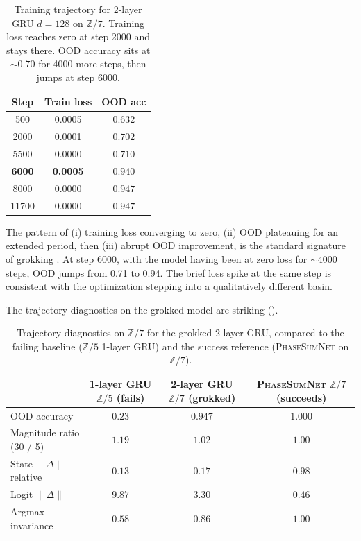 \documentclass[11pt]{article}
\theoremstyle{definition}
\newcommand{\Z}{\mathbb{Z}}
\begin{document}
\begin{table}[h]
\centering
\caption{Training trajectory for 2-layer GRU $d=128$ on $\Z/7$.
Training loss reaches zero at step 2000 and stays there. OOD
accuracy sits at $\sim 0.70$ for 4000 more steps, then jumps at
step 6000.}
\label{tab:grokking-trajectory}
\begin{tabular}{ccc}
\toprule
Step & Train loss & OOD acc \\
\midrule
500   & 0.0005 & $0.632$ \\
2000  & 0.0001 & $0.702$ \\
5500  & 0.0000 & $0.710$ \\
\textbf{6000} & \textbf{0.0005} & $\mathbf{0.940}$ \\
8000  & 0.0000 & $\mathbf{0.947}$ \\
11700 & 0.0000 & $0.947$ \\
\bottomrule
\end{tabular}
\end{table}

The pattern of (i) training loss converging to zero, (ii) OOD
plateauing for an extended period, then (iii) abrupt OOD
improvement, is the standard signature of grokking
\citep{power2022grokking}. At step 6000, with the model having been
at zero loss for $\sim$4000 steps, OOD jumps from 0.71 to 0.94. The
brief loss spike at the same step is consistent with the
optimization stepping into a qualitatively different basin.

The trajectory diagnostics on the grokked model are striking
().

\begin{table}[h]
\centering
\caption{Trajectory diagnostics on $\Z/7$ for the grokked 2-layer
GRU, compared to the failing baseline ($\Z/5$ 1-layer GRU) and the
success reference (\textsc{PhaseSumNet} on $\Z/7$).}
\label{tab:grokked-vs-failing}
\begin{tabular}{lccc}
\toprule
& 1-layer GRU $\Z/5$ (fails) & \textbf{2-layer GRU $\Z/7$ (grokked)} & \textsc{PhaseSumNet} $\Z/7$ (succeeds) \\
\midrule
OOD accuracy & $0.23$ & $\mathbf{0.947}$ & $1.000$ \\
Magnitude ratio (30 / 5) & $1.19$ & $\mathbf{1.02}$ & $1.00$ \\
State $\|\Delta\|$ relative & $0.13$ & $0.17$ & $0.98$ \\
Logit $\|\Delta\|$ & $9.87$ & $\mathbf{3.30}$ & $0.46$ \\
Argmax invariance & $0.58$ & $\mathbf{0.86}$ & $1.00$ \\
\bottomrule
\end{tabular}
\end{table}
\end{document}
